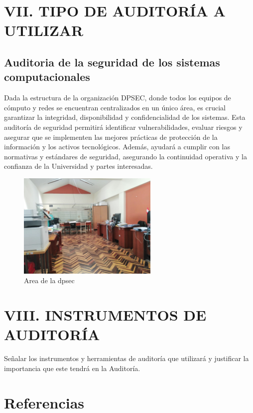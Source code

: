 \documentclass[12pt,a4paper]{article}
\begin{document}
\newpage
\section{VII. TIPO DE AUDITORÍA A UTILIZAR}
\subsection{Auditoria de la seguridad de los sistemas computacionales}
Dada la estructura de la organización DPSEC, donde todos los equipos de cómputo y redes se encuentran centralizados en un único área, es crucial garantizar la integridad, disponibilidad y confidencialidad de los sistemas. 
Esta auditoría de seguridad permitirá identificar vulnerabilidades, evaluar riesgos y asegurar que se implementen las mejores prácticas de protección de la información y los activos tecnológicos. 
Además, ayudará a cumplir con las normativas y estándares de seguridad, asegurando la continuidad operativa y la confianza de la Universidad y partes interesadas.
\begin{figure}[!htb]
    \centering
    \includegraphics[width=0.6\textwidth]{images/AreaTrabajo.jpeg}
    \caption{Area de la dpsec}
    
\end{figure}

\newpage
\section{VIII. INSTRUMENTOS DE AUDITORÍA}
Señalar los instrumentos y herramientas de auditoría que utilizará y justificar la importancia que
este tendrá en la Auditoría.


\newpage
\cite{prueba}
\section{Referencias}


\end{document}
